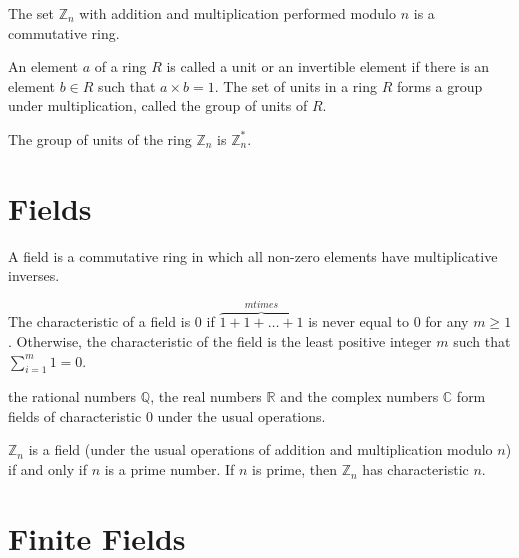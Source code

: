 \begin{myexample}
	The set $\mathbb{Z}_n$ with addition and multiplication performed modulo $n$ is a commutative ring.
\end{myexample}

\begin{mydef} 
	An element $a$ of a ring $R$ is called a unit or an invertible element if there is an element $b \in R $ such that $a \times b = 1$. 
	The set of units in a ring $R$ forms a group under multiplication, called the group of units of $R$.
\end{mydef}

\begin{myexample} 
	The group of units of the ring $\mathbb{Z}_n$ is $\mathbb{Z}_n^*$. 
\end{myexample}


\section{Fields}

\begin{mydef} 
	A field is a commutative ring in which all non-zero elements have multiplicative inverses.  
\end{mydef}

\begin{mydef} 
	The characteristic of a field is 0 if $\overbrace{1+1+\dots+1}^{m times}$ is never equal to $0$ for any $m \geq 1$. Otherwise, the characteristic of the field is the least positive integer $m$ such that $\sum_{i=1}^{m}1 = 0$.
\end{mydef}

\begin{myexample} 
the rational numbers $\mathbb{Q}$, the real numbers $\mathbb{R}$ and the complex numbers $\mathbb{C}$ form fields of characteristic $0$ under the usual operations. 
\end{myexample}

\begin{myexample} 
	$\mathbb{Z}_n$ is a field (under the usual operations of addition and multiplication modulo $n$) if and only if $n$ is a prime number. If $n$ is prime, then $\mathbb{Z}_n$ has characteristic $n$. 
\end{myexample}

\section{Finite Fields}

